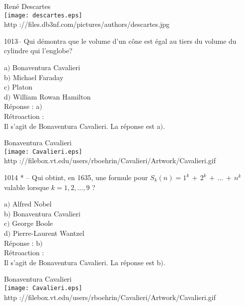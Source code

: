 ﻿\documentclass[letterpaper, 12pt]{article}
\begin{document}
        \begin{center}
        Ren\'e Descartes\\
    \texttt{[image: descartes.eps]}\\
        {\footnotesize http
://files.db3nf.com/pictures/authors/descartes.jpg}
    \end{center}

1013-- Qui d\'emontra que le volume d'un c\^one est \'egal au tiers
du volume du cylindre qui l'englobe?

a$)$ Bonaventura Cavalieri \\
b$)$ Michael Faraday \\
c$)$ Platon \\
d$)$ William Rowan Hamilton\\

R\'eponse : a$)$\\

R\'etroaction : \\
Il s'agit de Bonaventura Cavalieri.
La r\'eponse est a$)$.\\

        \begin{center}
        Bonaventura Cavalieri\\
    \texttt{[image: Cavalieri.eps]}\\
        {\footnotesize http
://filebox.vt.edu/users/rboehrin/Cavalieri/Artwork/Cavalieri.gif}
    \end{center}

1014 * -- Qui obtint, en 1635, une formule pour
$S_k(n)=1^k\,+\,2^k\,+\,\ldots\,+\,n^k$ valable lorsque
$k=1,2,\ldots,9$ ?

a$)$ Alfred Nobel \\
b$)$ Bonaventura Cavalieri \\
c$)$ George Boole \\
d$)$ Pierre-Laurent Wantzel\\

R\'eponse : b$)$\\

R\'etroaction : \\
Il s'agit de Bonaventura Cavalieri.
La r\'eponse est b$)$.\\

        \begin{center}
        Bonaventura Cavalieri\\
    \texttt{[image: Cavalieri.eps]}\\
        {\footnotesize http
://filebox.vt.edu/users/rboehrin/Cavalieri/Artwork/Cavalieri.gif}
    \end{center}
\end{document}
